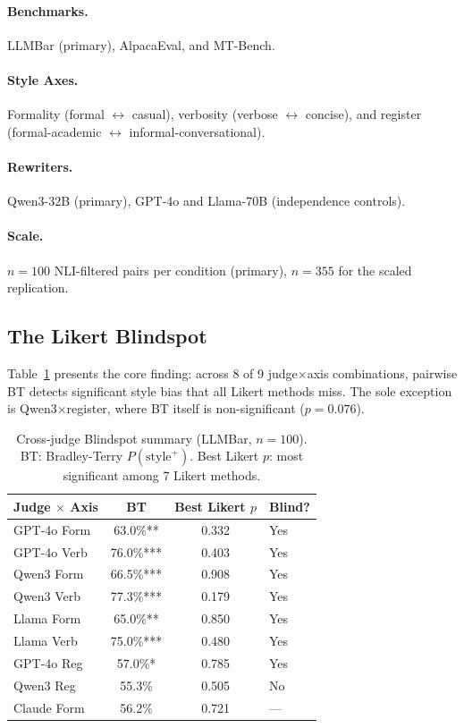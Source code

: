\documentclass[11pt,twocolumn]{article}
\begin{document}
\paragraph{Benchmarks.} LLMBar (primary), AlpacaEval, and MT-Bench.

\paragraph{Style Axes.} Formality (formal $\leftrightarrow$ casual), verbosity (verbose $\leftrightarrow$ concise), and register (formal-academic $\leftrightarrow$ informal-conversational).

\paragraph{Rewriters.} Qwen3-32B (primary), GPT-4o and Llama-70B (independence controls).

\paragraph{Scale.} $n = 100$ NLI-filtered pairs per condition (primary), $n = 355$ for the scaled replication.

\subsection{The Likert Blindspot}
\label{sec:blindspot}

Table~\ref{tab:blindspot} presents the core finding: across 8 of 9 judge$\times$axis combinations, pairwise BT detects significant style bias that all Likert methods miss. The sole exception is Qwen3$\times$register, where BT itself is non-significant ($p = 0.076$).

\begin{table}[t]
\centering
\small
\caption{Cross-judge Blindspot summary (LLMBar, $n = 100$). BT: Bradley-Terry $P(\text{style}^+)$. Best Likert $p$: most significant among 7 Likert methods.}
\label{tab:blindspot}
\begin{tabular}{@{}lccl@{}}
\toprule
Judge $\times$ Axis & BT & Best Likert $p$ & Blind? \\
\midrule
GPT-4o Form & 63.0\%** & 0.332 & Yes \\
GPT-4o Verb & 76.0\%*** & 0.403 & Yes \\
Qwen3 Form & 66.5\%*** & 0.908 & Yes \\
Qwen3 Verb & 77.3\%*** & 0.179 & Yes \\
Llama Form & 65.0\%** & 0.850 & Yes \\
Llama Verb & 75.0\%*** & 0.480 & Yes \\
GPT-4o Reg & 57.0\%* & 0.785 & Yes \\
Qwen3 Reg & 55.3\% & 0.505 & No \\
\midrule
Claude Form & 56.2\% & 0.721 & --- \\
\bottomrule
\end{tabular}
\vspace{-2mm}
\end{table}
\end{document}
